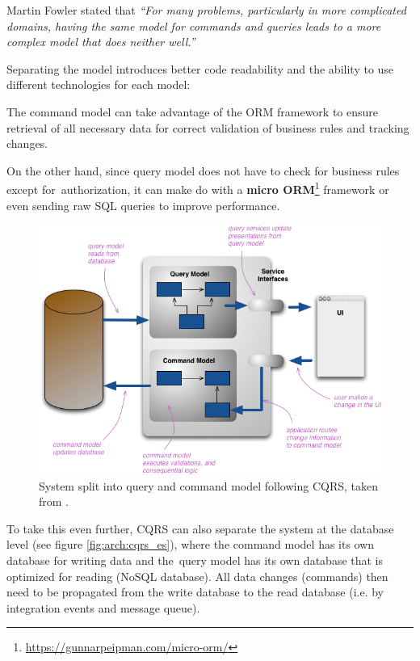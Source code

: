 Martin Fowler stated \cite{martin_fowler:cqrs} that \textit{``For many problems, particularly in more complicated domains, having the same model for commands and queries leads to a more complex model that does neither well.''}

Separating the model introduces better code readability and the ability to use different technologies for each model:

The command model can take advantage of the ORM framework to ensure retrieval of all necessary data for correct validation of business rules and tracking changes. 
    
On the other hand, since query model does not have to check for business rules except for~authorization, it can make do with a \textbf{micro ORM}\footnote{\url{https://gunnarpeipman.com/micro-orm/}} framework or even sending raw SQL queries to improve performance. 

\begin{figure} [H]
    \centering
    \includegraphics[width=\textwidth]{figures/cqrs.png}
    \caption{System split into query and command model following CQRS, taken from \cite{martin_fowler:cqrs}.}
    \label{fig:arch:cqrs}
\end{figure}

To take this even further, CQRS can also separate the system at the database level (see figure \ref{fig:arch:cqrs_es}), where the command model has its own database for writing data and the~query model has its own database that is optimized for reading (NoSQL database). All data changes (commands) then need to be propagated from the write database to the read database (i.e. by integration events and message queue). 


